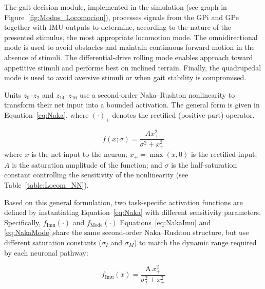 \documentclass[preprint,12pt]{elsarticle}
\begin{document}
The gait-decision module, implemented in the simulation (see graph in Figure~\ref{fig:Modos_Locomocion}), processes signals from the GPi and GPe together with IMU outputs to determine, according to the nature of the presented stimulus, the most appropriate locomotion mode. The omnidirectional mode is used to avoid obstacles and maintain continuous forward motion in the absence of stimuli. The differential-drive rolling mode enables approach toward appetitive stimuli and performs best on inclined terrain. Finally, the quadrupedal mode is used to avoid aversive stimuli or when gait stability is compromised. 

Units $z_0$--$z_2$ and $z_{14}$--$z_{16}$ use a second-order Naka--Rushton nonlinearity to transform their net input into a bounded activation. The general form is given in Equation~\eqref{eq:Naka}, where $(\cdot)_+$ denotes the rectified (positive-part) operator.

\begin{equation}
f(x;\sigma) = \frac{A x_+^2}{\sigma^2 + x_+^2}
\label{eq:Naka}
\end{equation}
where $x$ is the net input to the neuron; $x_+ = \max(x,0)$ is the rectified input; $A$ is the saturation amplitude of the function; and $\sigma$ is the half-saturation constant controlling the sensitivity of the nonlinearity (see Table~\ref{table:Locom_NN}).

Based on this general formulation, two task-specific activation functions are defined by instantiating Equation~\eqref{eq:Naka} with different sensitivity parameters. Specifically, $f_{\mathrm{Imu}}(\cdot)$ and $f_{\mathrm{Mode}}(\cdot)$ Equations~\eqref{eq:NakaImu} and \eqref{eq:NakaMode},share the same second-order Naka--Rushton structure, but use different saturation constants ($\sigma_I$ and $\sigma_M$) to match the dynamic range required by each neuronal pathway:

\begin{equation}
f_{\mathrm{Imu}}(x) = \frac{\mathrm{A}\, x_+^2}{\sigma_{I}^2 + x_+^2}
\label{eq:NakaImu}
\end{equation}
\end{document}
